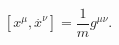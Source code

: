 \begin{equation}
\left[ x^{\mu },\stackrel{.}{x}^{\nu }\right] =\frac{1}{m}g^{\mu \nu }.
\label{mtrique}
\end{equation}

